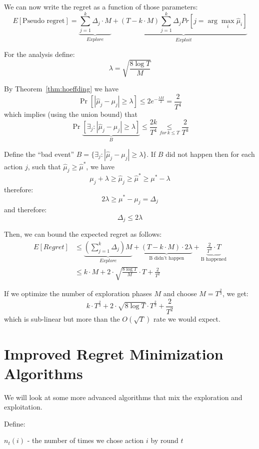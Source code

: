 We can now write the regret as a function of those parameters:
\[
E\left[\text{Pseudo regret}\right]=\underbrace{{\displaystyle
\sum_{j=1}^{k}\Delta_{j}\cdot
M}}_{Explore}+\underbrace{\left(T-k\cdot M\right){\displaystyle
\sum_{j=1}^{k}\Delta_{j}Pr\left[j=\arg\max_{i}\hat{\mu}_{i}\right]}}_{Exploit}
\]

For the analysis define:
\[
\lambda=\sqrt{\frac{8\log T}{M}}
\]

By Theorem~\ref{thm:hoeffding} we have
\[
\Pr\left[\left|\hat{\mu}_{j}-\mu_{j}\right|\ge\lambda\right]  \le
2e^{-\frac{\lambda M}{2}}=\frac{2}{T^{4}}
\]
which implies (using the union bound) that
\[
\Pr\underbrace{\left[\exists_{j}:\left|\hat{\mu}_{j}-\mu_{j}\right|\ge\lambda\right]}_{B}
 \le  \frac{2k}{T^{4}}\underset{for\,k\leq T}{\leq}\frac{2}{T^{3}}
\]

Define the ``bad event''
$B=\{\exists_{j}:\left|\hat{\mu}_{j}-\mu_{j}\right|\ge\lambda\}$. If
$B$ did not happen then for each action $j$, such that
$\hat{\mu}_{j}\ge\hat{\mu}^{*}$, we have
\[
\mu_{j}+\lambda\ge\hat{\mu}_{j}\ge\hat{\mu}^{*}\ge\mu^{*}-\lambda
\]
therefore:
\[
2\lambda\ge\mu^{*}-\mu_{j}=\Delta_{j}
\]
and therefore:
\[
\Delta_{j}\le2\lambda
\]

Then, we can bound the expected regret as follows:
\begin{align*}
E[Regret] & \leq  \underbrace{\left({\displaystyle
\sum_{j=1}^{k}\Delta_{j}}\right)M}_{Explore}+\underbrace{\left(T-k\cdot
M\right)\cdot2\lambda}_{\text{B didn't
happen}}+\underbrace{\frac{2}{T^{3}}\cdot T}_{\text{B happened}}\\
 & \leq  k\cdot M+2\cdot\sqrt{\frac{8\log T}{M}}\cdot T+\frac{2}{T^{2}}
\end{align*}

If we optimize the number of exploration phases $M$ and choose $M=T^{\frac{2}{3}}$,
we get:
\[
k\cdot T^{\frac{2}{3}}+2\cdot\sqrt{8\log T}\cdot
T^{\frac{2}{3}}+\frac{2}{T^{2}}
\]
which is sub-linear but more than the $O(\sqrt{T})$ rate we would
expect.

\section{Improved Regret Minimization Algorithms}

We will look at some more advanced algorithms that mix the
exploration and exploitation.

Define:

$n_{t}(i)$ - the number of times we chose action $i$ by round $t$

